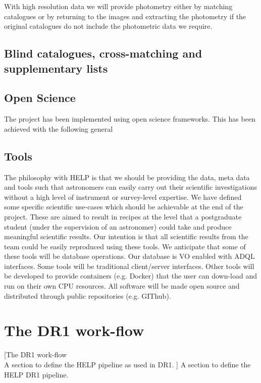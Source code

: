 \documentclass[usenatbib]{mnras}
\begin{document}
With high resolution data we will provide photometry either by matching
catalogues or by returning to the images and extracting the photometry if the
original catalogues do not include the photometric data we require.
\subsection[Blind catalogues, cross-matching and supplementary lists\\{\color{red}Some of this should go into the strategy as it is not implemented in DR1, but this is where to discuss the blind SPIRE catalogues that Steven has produced, plus spec-z catalogues, radio catalogues?}]{Blind catalogues, cross-matching and supplementary lists}

\subsection[Open Science]{Open Science}
The project has been implemented using open science frameworks. This has been achieved with the following general 



\subsection{Tools}

The philosophy with HELP is that we should be providing the data, meta data and
tools such that astronomers can easily carry out their scientific investigations
without a high level of instrument or survey-level expertise.  We have defined
some specific scientific use-cases which should be achievable at the end of the
project.  These are aimed to result in recipes at the level  that a postgraduate
student (under the supervision of an astronomer) could take and produce
meaningful scientific results.  Our intention is that all scientific results
from the team could be easily reproduced using these tools.  We anticipate that
some of these tools will be database operations.  Our database is VO enabled
with ADQL interfaces.  Some tools will be traditional client/server interfaces.
Other tools will be developed to provide containers (e.g. Docker) that the user
can down-load and run on their own CPU resources.  All software will be made
open source and distributed through public repositories (e.g. GIThub).

\section{The DR1 work-flow}[The DR1 work-flow\\{\color{red} A section to define the HELP pipeline as used in DR1.  }]
{\color{red} A section to define the HELP DR1 pipeline.  }
\end{document}
